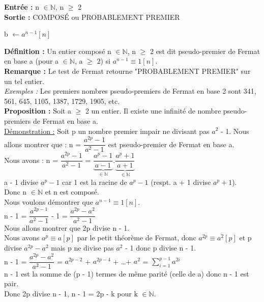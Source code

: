 \documentclass[12pt,a4paper]{article}
\begin{document}
\textbf{Entrée :} n $\in \mathbb{N}$, n $\geq$ 2\\
\textbf{Sortie :} COMPOSÉ ou PROBABLEMENT PREMIER\\
\begin{algorithm}[H]
	b $\gets a^{n - 1}[n]$\\
\end{algorithm}
\textbf{Définition :} Un entier composé n $\in \mathbb{N}$, n $\geq$ 2 est dit pseudo-premier de Fermat en base a (pour a $\in \mathbb{N}$, a $\geq$ 2) si $a^{n - 1} \equiv 1[n]$.\\
\textbf{Remarque :} Le test de Fermat retourne "PROBABLEMENT PREMIER" sur un tel entier.\\
\textit{Exemples :} Les premiers nombres pseudo-premiers de Fermat en base 2 sont 341, 561, 645, 1105, 1387, 1729, 1905, etc.\\
\textbf{Proposition :} Soit a $\geq$ 2 un entier. Il existe une infinité de nombre pseudo-premiers de Fermat en base a.\\
\underline{Démonstration :} Soit p un nombre premier impair ne divisant pas $a^2$ - 1. Nous allons montrer que : n = $\dfrac{a^{2p} - 1}{a^2 - 1}$ est pseudo-premier de Fermat en base a.\\
Nous avons : n = $\dfrac{a^{2p} - 1}{a^2 - 1}$ = $\underbrace{\dfrac{a^p - 1}{a - 1}}_{\in \mathbb{N}}$.$\underbrace{\dfrac{a^p + 1}{a + 1}}_{\in \mathbb{N}}$\\
a - 1 divise $a^p -1$ car 1 est la racine de $a^p -1$ (respt. a + 1 divise $a^p + 1$).\\
Donc n $\in \mathbb{N}$ et n est composé.\\
Nous voulons démontrer que $a^{n - 1} \equiv 1[n]$.\\
n - 1 = $\dfrac{a^{2p-1}}{a^2 - 1}$ - 1 = $\dfrac{a^{2p} - a^2}{a^2 - 1}$\\
Nous allons montrer que 2p divise n - 1.\\
Nous avons $a^p \equiv a[p]$ par le petit théorème de Fermat, donc $a^{2p} \equiv a^2[p]$ et p divise $a^{2p} - a^2$ mais p ne divise pas $a^2$ - 1 donc p divise n - 1.\\
n - 1 = $\dfrac{a^{2p} - a^2}{a^2 - 1}$ = $a^{2p - 2}$ + $a^{2p - 4}$ + \dots + $a^2$ = $\sum\limits_{i = 1}^{p - 1} a^{2i}$\\
n - 1 est la somme de (p - 1) termes de même parité (celle de a) donc n - 1 est pair.\\
Donc 2p divise n - 1, n - 1 = 2p - k pour k $\in \mathbb{N}$.\\
\end{document}
